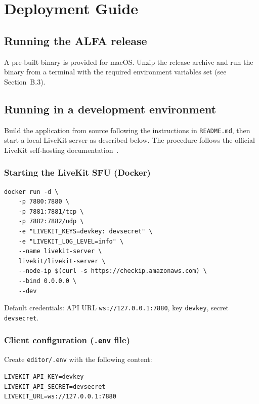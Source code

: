 \documentclass[a4paper,11pt,twoside]{report}
\theoremstyle{definition}
\begin{document}

\chapter{Deployment Guide}
\thispagestyle{empty}

\section*{Running the ALFA release}

A pre-built binary is provided for macOS. Unzip the release archive and run the binary
from a terminal with the required environment variables set (see Section~B.3).

\section*{Running in a development environment}

Build the application from source following the instructions in \texttt{README.md},
then start a local LiveKit server as described below. The procedure follows the official
LiveKit self-hosting documentation~\cite{livekit-deployment}.

\subsection*{Starting the LiveKit SFU (Docker)}

\begin{verbatim}
docker run -d \
    -p 7880:7880 \
    -p 7881:7881/tcp \
    -p 7882:7882/udp \
    -e "LIVEKIT_KEYS=devkey: devsecret" \
    -e "LIVEKIT_LOG_LEVEL=info" \
    --name livekit-server \
    livekit/livekit-server \
    --node-ip $(curl -s https://checkip.amazonaws.com) \
    --bind 0.0.0.0 \
    --dev
\end{verbatim}

Default credentials: API URL \texttt{ws://127.0.0.1:7880}, key \texttt{devkey},
secret \texttt{devsecret}.

\subsection*{Client configuration (\texttt{.env} file)}

Create \texttt{editor/.env} with the following content:

\begin{verbatim}
LIVEKIT_API_KEY=devkey
LIVEKIT_API_SECRET=devsecret
LIVEKIT_URL=ws://127.0.0.1:7880
\end{verbatim}
\end{document}
